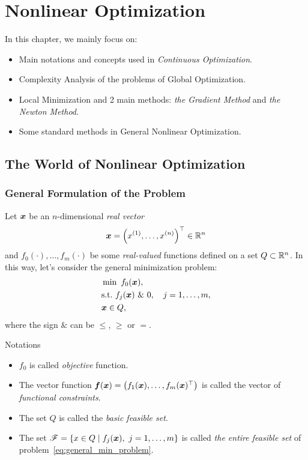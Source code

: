 \chapter{Nonlinear Optimization}\label{chap:nonlinear_optimization}

In this chapter, we mainly focus on:
\begin{itemize}
    \item Main notations and concepts used in \emph{Continuous Optimization}.
    \item Complexity Analysis of the problems of Global Optimization.
    \item Local Minimization and 2 main methods: \emph{the Gradient Method} and \emph{the Newton Method}.
    \item Some standard methods in General Nonlinear Optimization.
\end{itemize}

\section{The World of Nonlinear Optimization}\label{sec:the_world_of_nonlinear_optimization}

\subsection{General Formulation of the Problem}\label{subsec:general_formulation_of_the_problem}
Let \(\boldsymbol{x}\) be an \(n\)-dimensional \emph{real vector}
\[
    \boldsymbol{x} = \left( x^{(1)}, \dots, x^{(n)} \right)^\top \in \mathbb{R}^n
\]
and \(f_0(\cdot), \dots, f_m(\cdot)\) be some \emph{real-valued} functions defined on a set \(Q \subset \mathbb{R}^n\). In this way, let's consider the general minimization problem:
\begin{equation}\label{eq:general_min_problem}
    \begin{aligned}
        &\min ~ f_0(\boldsymbol{x}), \\
        &\text{s.t.}~f_j(\boldsymbol{x}) ~ \& ~ 0, \quad j = 1, \dots, m,\\
        &\boldsymbol{x} \in Q,
    \end{aligned}
\end{equation}
where the sign \(\&\) can be \(\le\), \(\ge\) or \(=\).

\begin{note}{Notations}
    \begin{itemize}
        \item \(f_0\) is called \emph{objective} function.
        \item The vector function \(\boldsymbol{f}(\boldsymbol{x}) = \left( f_1(\boldsymbol{x}), \dots, f_m(\boldsymbol{x})^\top \right)\) is called the vector of \emph{functional constraints}.
        \item The set \(Q\) is called the \emph{basic feasible set}.
        \item The set \( \mathscr{F} = \{ x \in Q \mid f_j(\boldsymbol{x}), ~j=1, \dots, m \}\) is called \emph{the entire feasible set} of problem~\ref{eq:general_min_problem}. 
    \end{itemize}
\end{note}

